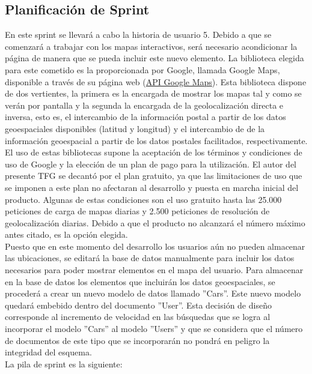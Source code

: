 	\subsection{Planificación de Sprint}
	En este sprint se llevará a cabo la historia de usuario 5. Debido a que se comenzará a trabajar con los mapas interactivos, será necesario acondicionar la página de manera que se pueda incluir este nuevo elemento. La biblioteca elegida para este cometido es la proporcionada por Google, llamada Google Maps, disponible a través de su página web (\href{https://developers.google.com/maps/?hl=es}{API Google Maps}). Esta biblioteca dispone de dos vertientes, la primera es la encargada de mostrar los mapas tal y como se verán por pantalla y la segunda la encargada de la geolocalización directa e inversa, esto es, el intercambio de la información postal a partir de los datos geoespaciales disponibles (latitud y longitud) y el intercambio de de la información geoespacial a partir de los datos postales facilitados, respectivamente. El uso de estas bibliotecas supone la aceptación de los términos y condiciones de uso de Google y la elección de un plan de pago para la utilización. El autor del presente TFG se decantó por el plan gratuito, ya que las limitaciones de uso que se imponen a este plan no afectaran al desarrollo y puesta en marcha inicial del producto. Algunas de estas condiciones son el uso gratuito hasta las 25.000 peticiones de carga de mapas diarias y 2.500 peticiones de resolución de geolocalización diarias. Debido a que el producto no alcanzará el número máximo antes citado, es la opción elegida.\\
	Puesto que en este momento del desarrollo los usuarios aún no pueden almacenar las ubicaciones, se editará la base de datos manualmente para incluir los datos necesarios para poder mostrar elementos en el mapa del usuario. Para almacenar en la base de datos los elementos que incluirán los datos geoespaciales, se procederá a crear un nuevo modelo de datos llamado ''Cars''. Este nuevo modelo quedará embebido dentro del documento ''User''. Esta decisión de diseño corresponde al incremento de velocidad en las búsquedas que se logra al incorporar el modelo ''Cars'' al modelo ''Users'' y que se considera que el número de documentos de este tipo que se incorporarán no pondrá en peligro la integridad del esquema.\\
	La pila de sprint es la siguiente:\\

